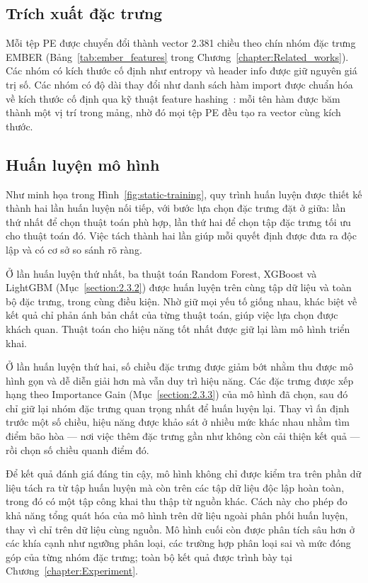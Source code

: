\documentclass[../DoAn.tex]{subfiles}
\begin{document}
\subsection{Trích xuất đặc trưng}
\label{section:3.3.2}

Mỗi tệp PE được chuyển đổi thành vector 2.381 chiều theo chín nhóm
đặc trưng EMBER (Bảng~\ref{tab:ember_features} trong Chương~\ref{chapter:Related_works}).
Các nhóm có kích thước cố định như entropy và header info được giữ
nguyên giá trị số. Các nhóm có độ dài thay đổi như danh sách hàm
import được chuẩn hóa về kích thước cố định qua kỹ thuật feature
hashing~\cite{weinberger2009}: mỗi tên hàm được băm thành một vị trí
trong mảng, nhờ đó mọi tệp PE đều tạo ra vector cùng kích thước.

\subsection{Huấn luyện mô hình}
\label{section:3.3.3}

Như minh họa trong Hình~\ref{fig:static-training}, quy trình huấn
luyện được thiết kế thành hai lần huấn luyện nối tiếp, với bước lựa
chọn đặc trưng đặt ở giữa: lần thứ nhất để chọn thuật toán phù hợp,
lần thứ hai để chọn tập đặc trưng tối ưu cho thuật toán đó. Việc tách
thành hai lần giúp mỗi quyết định được đưa ra độc lập và có cơ sở so
sánh rõ ràng.

Ở lần huấn luyện thứ nhất, ba thuật toán Random Forest, XGBoost và
LightGBM (Mục~\ref{section:2.3.2}) được huấn luyện trên cùng tập dữ
liệu và toàn bộ đặc trưng, trong cùng điều kiện. Nhờ giữ mọi yếu tố
giống nhau, khác biệt về kết quả chỉ phản ánh bản chất của từng thuật
toán, giúp việc lựa chọn được khách quan. Thuật toán cho hiệu năng tốt
nhất được giữ lại làm mô hình triển khai.

Ở lần huấn luyện thứ hai, số chiều đặc trưng được giảm bớt nhằm thu
được mô hình gọn và dễ diễn giải hơn mà vẫn duy trì hiệu năng. Các đặc
trưng được xếp hạng theo Importance Gain (Mục~\ref{section:2.3.3}) của
mô hình đã chọn, sau đó chỉ giữ lại nhóm đặc trưng quan trọng nhất để
huấn luyện lại. Thay vì ấn định trước một số chiều, hiệu năng được khảo
sát ở nhiều mức khác nhau nhằm tìm điểm bão hòa --- nơi việc thêm đặc
trưng gần như không còn cải thiện kết quả --- rồi chọn số chiều quanh
điểm đó.

Để kết quả đánh giá đáng tin cậy, mô hình không chỉ được kiểm tra trên
phần dữ liệu tách ra từ tập huấn luyện mà còn trên các tập dữ liệu độc
lập hoàn toàn, trong đó có một tập công khai thu thập từ nguồn khác.
Cách này cho phép đo khả năng tổng quát hóa của mô hình trên dữ liệu
ngoài phân phối huấn luyện, thay vì chỉ trên dữ liệu cùng nguồn. Mô
hình cuối còn được phân tích sâu hơn ở các khía cạnh như ngưỡng phân
loại, các trường hợp phân loại sai và mức đóng góp của từng nhóm đặc
trưng; toàn bộ kết quả được trình bày tại Chương~\ref{chapter:Experiment}.
\end{document}
